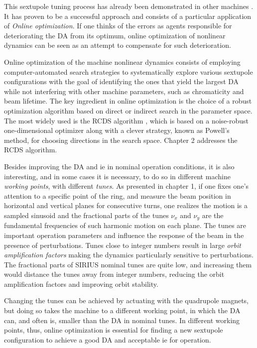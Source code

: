This sextupole tuning process has already been demonstrated in other machines \cite{huang_algorithm_2013, huang_online_2015,liuzzo_rcds_2016,olsson_online_2018, yang_online_2022}. It has proven to be a successful approach and consists of a particular application of \textit{Online optimization}. If one thinks of the errors as agents responsible for deteriorating the \gls*{DA} from its optimum, online optimization of nonlinear dynamics can be seen as an attempt to compensate for such deterioration.

Online optimization of the machine nonlinear dynamics consists of employing computer-automated search strategies to systematically explore various sextupole configurations with the goal of identifying the ones that yield the largest DA while not interfering with other machine parameters, such as chromaticity and beam lifetime. The key ingredient in online optimization is the choice of a robust optimization algorithm based on direct or indirect search in the parameter space. The most widely used is the \gls*{RCDS} algorithm \cite{huang_algorithm_2013}, which is based on a noise-robust one-dimensional optimizer along with a clever strategy, known as Powell's method, for choosing directions in the search space. Chapter 2 addresses the RCDS algorithm.

Besides improving the \gls*{DA} and \gls*{ie} in nominal operation conditions, it is also interesting, and in some cases it is necessary, to do so in different machine \textit{working points}, with different \textit{tunes}. As presented in chapter 1, if one fixes one's attention to a specific point of the ring, and measure the beam position in horizontal and vertical planes for consecutive turns, one realizes the motion is a sampled sinusoid and the fractional parts of the tunes $\nu_x$ and $\nu_y$ are the fundamental frequencies of such harmonic motion on each plane. The tunes are important operation parameters and influence the response of the beam in the presence of perturbations. Tunes close to integer numbers result in large \textit{orbit amplification factors} making the dynamics particularly sensitive to perturbations. The fractional parts of SIRIUS nominal tunes are quite low, and increasing them would distance the tunes away from integer numbers, reducing the orbit amplification factors and improving orbit stability.

Changing the tunes can be achieved by actuating with the quadrupole magnets, but doing so takes the machine to a different working point, in which the DA can, and often is, smaller than the \gls*{DA} in nominal tunes. In different working points, thus, online optimization is essential for finding a new sextupole configuration to achieve a good \gls*{DA} and acceptable \gls*{ie} for operation.


